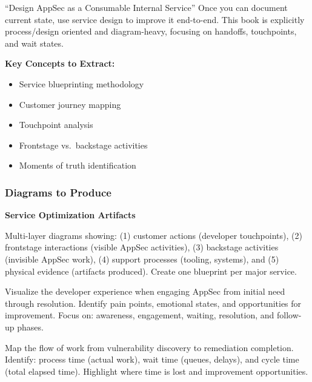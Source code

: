 \documentclass[11pt,letterpaper]{article}
\begin{document}
\begin{bookbox}{``Design AppSec as a Consumable Internal Service''}
Once you can document current state, use service design to improve it end-to-end. This book is explicitly process/design oriented and diagram-heavy, focusing on handoffs, touchpoints, and wait states.

\vspace{0.5cm}

\textbf{Key Concepts to Extract:}
\begin{itemize}[nosep]
    \item Service blueprinting methodology
    \item Customer journey mapping
    \item Touchpoint analysis
    \item Frontstage vs.\ backstage activities
    \item Moments of truth identification
\end{itemize}
\end{bookbox}

\subsubsection{Diagrams to Produce}

\begin{diagrambox}
\textbf{Service Optimization Artifacts}

\begin{description}[leftmargin=1.5cm, style=nextline]
    \item[Service Blueprints for AppSec Services]
    Multi-layer diagrams showing: (1) customer actions (developer touchpoints), (2) frontstage interactions (visible AppSec activities), (3) backstage activities (invisible AppSec work), (4) support processes (tooling, systems), and (5) physical evidence (artifacts produced). Create one blueprint per major service.

    \item[Customer Journey Maps]
    Visualize the developer experience when engaging AppSec from initial need through resolution. Identify pain points, emotional states, and opportunities for improvement. Focus on: awareness, engagement, waiting, resolution, and follow-up phases.

    \item[Value Stream Maps]
    Map the flow of work from vulnerability discovery to remediation completion. Identify: process time (actual work), wait time (queues, delays), and cycle time (total elapsed time). Highlight where time is lost and improvement opportunities.
\end{description}
\end{diagrambox}
\end{document}
